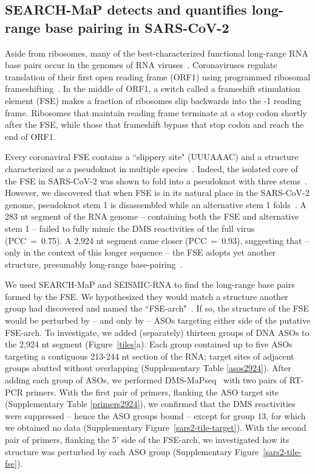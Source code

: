 \documentclass[main.tex]{subfiles}
\begin{document}
\subsection{SEARCH-MaP detects and quantifies long-range base pairing in SARS-CoV-2}

Aside from ribosomes, many of the best-characterized functional long-range RNA base pairs occur in the genomes of RNA viruses~\cite{Nicholson2014}.
Coronaviruses regulate translation of their first open reading frame (ORF1) using programmed ribosomal frameshifting~\cite{Plant2008}.
In the middle of ORF1, a switch called a frameshift stimulation element (FSE) makes a fraction of ribosomes slip backwards into the -1 reading frame.
Ribosomes that maintain reading frame terminate at a stop codon shortly after the FSE, while those that frameshift bypass that stop codon and reach the end of ORF1.

Every coronaviral FSE contains a ``slippery site" (UUUAAAC) and a structure characterized as a pseudoknot in multiple species~\cite{Brierley1989,Herald1993,Plant2005b}.
Indeed, the isolated core of the FSE in SARS-CoV-2 was shown to fold into a pseudoknot with three stems~\cite{KZhang2021,Roman2021,Jones2022}.
However, we discovered that when FSE is in its natural place in the SARS-CoV-2 genome, pseudoknot stem 1 is disassembled while an alternative stem 1 folds~\cite{Lan2022}.
A 283 nt segment of the RNA genome -- containing both the FSE and alternative stem 1 -- failed to fully mimic the DMS reactivities of the full virus (PCC~=~0.75).
A 2,924 nt segment came closer (PCC~=~0.93), suggesting that -- only in the context of this longer sequence -- the FSE adopts yet another structure, presumably long-range base-pairing~\cite{Lan2022}.

We used SEARCH-MaP and SEISMIC-RNA to find the long-range base pairs formed by the FSE.
We hypothesized they would match a structure another group had discovered and named the ``FSE-arch"~\cite{Ziv2020}.
If so, the structure of the FSE would be perturbed by -- and only by -- ASOs targeting either side of the putative FSE-arch.
To investigate, we added (separately) thirteen groups of DNA ASOs to the 2,924 nt segment (Figure~\ref{tiles}a).
Each group contained up to five ASOs targeting a contiguous 213-244 nt section of the RNA; target sites of adjacent groups abutted without overlapping (Supplementary Table \ref{asos2924}).
After adding each group of ASOs, we performed DMS-MaPseq~\cite{Zubradt2016} with two pairs of RT-PCR primers.
With the first pair of primers, flanking the ASO target site (Supplementary Table \ref{primers2924}), we confirmed that the DMS reactivities were suppressed -- hence the ASO groups bound -- except for group 13, for which we obtained no data (Supplementary Figure~\ref{sars2-tile-target}).
With the second pair of primers, flanking the 5' side of the FSE-arch, we investigated how its structure was perturbed by each ASO group (Supplementary Figure~\ref{sars2-tile-fse}).
\end{document}
